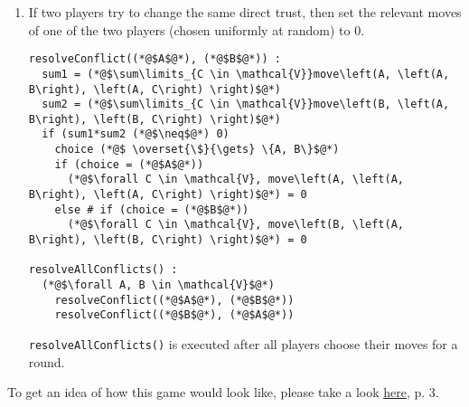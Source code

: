 \begin{enumerate}
  \item If two players try to change the same direct trust, then set the relevant moves of one of the two players (chosen
    uniformly at random) to 0.
  \begin{lstlisting}[label=conflict, style=numbers]
resolveConflict((*@$A$@*), (*@$B$@*)) :
  sum1 = (*@$\sum\limits_{C \in \mathcal{V}}move\left(A, \left(A, B\right), \left(A, C\right) \right)$@*)
  sum2 = (*@$\sum\limits_{C \in \mathcal{V}}move\left(B, \left(A, B\right), \left(B, C\right) \right)$@*)
  if (sum1*sum2 (*@$\neq$@*) 0)
    choice (*@$ \overset{\$}{\gets} \{A, B\}$@*)
    if (choice = (*@$A$@*))
      (*@$\forall C \in \mathcal{V}, move\left(A, \left(A, B\right), \left(A, C\right) \right)$@*) = 0
    else # if (choice = (*@$B$@*))
      (*@$\forall C \in \mathcal{V}, move\left(B, \left(A, B\right), \left(B, C\right) \right)$@*) = 0

resolveAllConflicts() :
  (*@$\forall A, B \in \mathcal{V}$@*)
    resolveConflict((*@$A$@*), (*@$B$@*))
    resolveConflict((*@$B$@*), (*@$A$@*))
  \end{lstlisting}
  \texttt{resolveAllConflicts()} is executed after all players choose their moves for a round.
\end{enumerate}

To get an idea of how this game would look like, please take a look
\href{http://www.agsm.edu.au/bobm/teaching/SGTM/lect06pr-3.pdf}{here}, p. 3.
